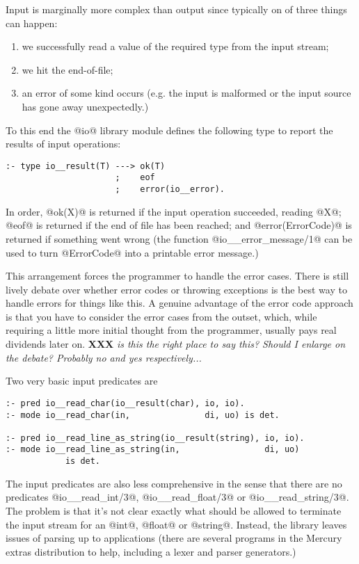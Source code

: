 \documentclass[a4paper,11pt,notitlepage,onecolumn]{article}
\newcommand{\XXX}[1]%
{{\small\textbf{XXX} \emph{#1}}}
\begin{document}
Input is marginally more complex than output since
typically on of three things can happen:
\begin{enumerate}
\item we successfully read a value of the required type from
  the input stream;
\item we hit the end-of-file;
\item an error of some kind occurs (e.g. the input is
  malformed or the input source has gone away unexpectedly.)
\end{enumerate}

To this end the @io@ library module defines the following
type to report the results of input operations:
\begin{verbatim}
:- type io__result(T) ---> ok(T)
                      ;    eof
                      ;    error(io__error).
\end{verbatim}
In order, @ok(X)@ is returned if the input operation
succeeded, reading @X@; @eof@ is returned if the end of file
has been reached; and @error(ErrorCode)@ is returned if
something went wrong (the function @io__error_message/1@ can
be used to turn @ErrorCode@ into a printable error message.)

This arrangement forces the programmer to handle the error
cases.  There is still lively debate over whether error
codes or throwing exceptions is the best way to handle
errors for things like this.  A genuine advantage of the
error code approach is that you have to consider the error
cases from the outset, which, while requiring a little
more initial thought from the programmer, usually pays
real dividends later on.
\XXX{is this the right place to say this?  Should I
enlarge on the debate?  Probably no and yes
respectively...}

Two very basic input predicates are
\begin{verbatim}
:- pred io__read_char(io__result(char), io, io).
:- mode io__read_char(in,               di, uo) is det.

:- pred io__read_line_as_string(io__result(string), io, io).
:- mode io__read_line_as_string(in,                 di, uo)
            is det.
\end{verbatim}

The input predicates are also less comprehensive in the
sense that there are no predicates @io__read_int/3@,
@io__read_float/3@ or @io__read_string/3@.  The problem is
that it's not clear exactly what should be allowed to
terminate the input stream for an @int@, @float@ or @string@.
Instead, the library leaves issues of parsing up to
applications (there are several programs in the Mercury
extras distribution to help, including a lexer and parser
generators.)
\end{document}
